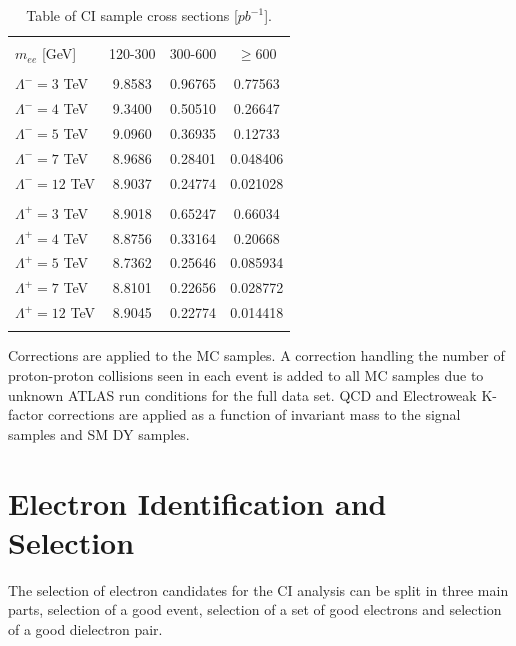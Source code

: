 	\begin{table}[h!]
	\centering %
	\begin{tabular}{l ccc} %
	\hline\hline \\[-2ex] %
	$m_{ee}$ [GeV] & 120-300 & 300-600 & $\geq 600$ \\ [0.2ex]
	\hline  \\[-2ex] %
	$\Lambda^{-} = 3$ TeV & 9.8583 & 0.96765 & 0.77563 \\ 
	$\Lambda^{-} = 4$ TeV & 9.3400 & 0.50510 & 0.26647 \\ 
	$\Lambda^{-} = 5$ TeV & 9.0960 & 0.36935 & 0.12733 \\  
	$\Lambda^{-} = 7$ TeV & 8.9686 & 0.28401 & 0.048406 \\  
	$\Lambda^{-} = 12$ TeV & 8.9037 & 0.24774 & 0.021028 \\ 
	\hline  \\[-2ex] %
	$\Lambda^{+} = 3$ TeV & 8.9018 & 0.65247 & 0.66034 \\ 
	$\Lambda^{+} = 4$ TeV & 8.8756 & 0.33164 & 0.20668 \\  
	$\Lambda^{+} = 5$ TeV & 8.7362 & 0.25646 & 0.085934 \\ 
	$\Lambda^{+} = 7$ TeV & 8.8101 & 0.22656 & 0.028772 \\ 
	$\Lambda^{+} = 12$ TeV & 8.9045 & 0.22774 & 0.014418 \\ 
	\hline\hline  \\ %
	\end{tabular}
	\caption{Table of CI sample cross sections [$pb^{-1}$].} %
	\label{tab:CIyeilds}
	\end{table}

	Corrections are applied to the MC samples. A correction handling the number of proton-proton collisions seen in each event is added to all MC samples due to unknown ATLAS run conditions for the full data set. QCD and Electroweak K-factor corrections are applied as a function of invariant mass to the signal samples and SM DY samples. %



\section{Electron Identification and Selection}

	The selection of electron candidates for the CI analysis can be split in three main parts, selection of a good event, selection of a set of good electrons and selection of a good dielectron pair.\\

